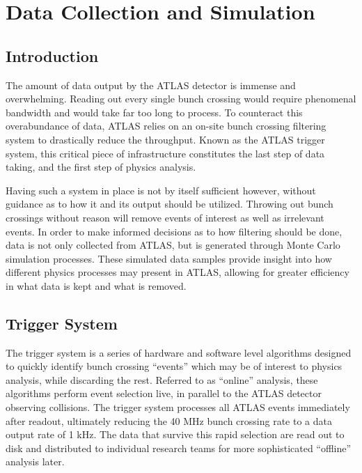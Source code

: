 \chapter{Data Collection and Simulation} \label{chapter:data}

\section{Introduction}

    The amount of data output by the ATLAS detector is immense and overwhelming.
    Reading out every single bunch crossing would require phenomenal bandwidth and would take far too long to process.
    To counteract this overabundance of data, ATLAS relies on an on-site bunch crossing filtering system to drastically reduce the throughput.
    Known as the ATLAS trigger system, this critical piece of infrastructure constitutes the last step of data taking,
        and the first step of physics analysis.
        
    Having such a system in place is not by itself sufficient however,
        without guidance as to how it and its output should be utilized.
    Throwing out bunch crossings without reason will remove events of interest as well as irrelevant events.
    In order to make informed decisions as to how filtering should be done,
        data is not only collected from ATLAS, but is generated through Monte Carlo simulation processes.
    These simulated data samples provide insight into how different physics processes may present in ATLAS,
        allowing for greater efficiency in what data is kept and what is removed.


\section{Trigger System} \label{sec:trigger}

    The trigger system is a series of hardware and software level algorithms designed to quickly identify bunch crossing ``events'' which may be of interest to physics analysis, while discarding the rest.
    Referred to as ``online'' analysis, these algorithms perform event selection live, in parallel to the ATLAS detector observing collisions.
    The trigger system processes all ATLAS events immediately after readout, ultimately reducing the 40 MHz bunch crossing rate to a data output rate of 1 kHz.
    The data that survive this rapid selection are read out to disk and distributed to individual research teams for more sophisticated ``offline'' analysis later.

